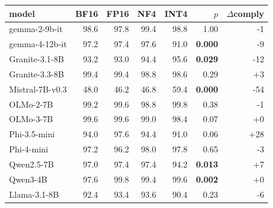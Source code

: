 \begin{tabular}{lrrrrrr}
\toprule
model & BF16 & FP16 & NF4 & INT4 & $p$ & $\Delta$comply \\
\midrule
gemma-2-9b-it & 98.6 & 97.8 & 99.4 & 98.8 & 1.00 & -1 \\
gemma-4-12b-it & 97.2 & 97.4 & 97.6 & 91.0 & \textbf{0.000} & -9 \\
Granite-3.1-8B & 93.2 & 93.0 & 94.4 & 95.6 & \textbf{0.029} & -12 \\
Granite-3.3-8B & 99.4 & 99.4 & 98.8 & 98.6 & 0.29 & +3 \\
Mistral-7B-v0.3 & 48.0 & 46.2 & 46.8 & 59.4 & \textbf{0.000} & -54 \\
OLMo-2-7B & 99.2 & 99.6 & 98.8 & 99.8 & 0.38 & -1 \\
OLMo-3-7B & 99.6 & 99.6 & 99.0 & 98.4 & 0.07 & +0 \\
Phi-3.5-mini & 94.0 & 97.6 & 94.4 & 91.0 & 0.06 & +28 \\
Phi-4-mini & 97.2 & 96.2 & 98.0 & 97.8 & 0.65 & -3 \\
Qwen2.5-7B & 97.0 & 97.4 & 97.4 & 94.2 & \textbf{0.013} & +7 \\
Qwen3-4B & 97.6 & 99.8 & 99.4 & 99.6 & \textbf{0.002} & +0 \\
Llama-3.1-8B & 92.4 & 93.4 & 93.6 & 90.4 & 0.23 & -6 \\
\bottomrule
\end{tabular}
